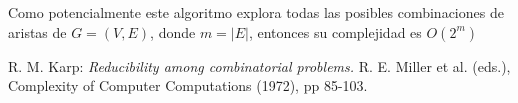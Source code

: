 \documentclass{article}
\begin{document}
Como potencialmente este algoritmo explora todas las posibles combinaciones de aristas de $G = (V,E)$, donde $m=|E|$, entonces su complejidad es $O(2^m)$



\bigskip
\begin{thebibliography}{20}
     R. M. Karp: \emph{Reducibility among combinatorial problems.} R. E. Miller et al. (eds.), Complexity of Computer Computations (1972), pp 85-103.
\end{thebibliography}
\end{document}
